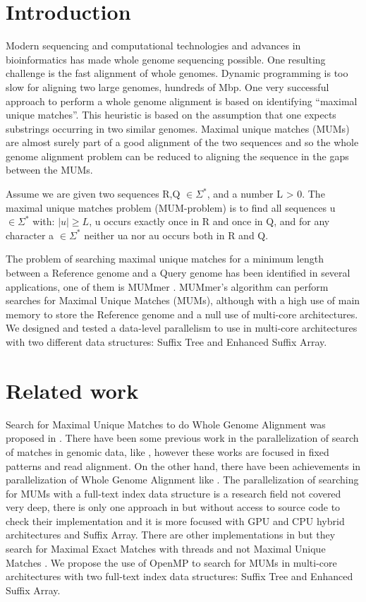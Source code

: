 \documentclass[runningheads,a4paper]{llncs}
\begin{document}
\section{Introduction} 
Modern sequencing and computational technologies and advances in bioinformatics has made whole genome sequencing possible. One resulting challenge is the fast alignment of whole genomes. Dynamic programming is too slow for aligning two large genomes, hundreds of Mbp. One very successful approach to perform a whole genome alignment is based on identifying ``maximal unique matches''. This heuristic is based on the assumption that one expects substrings occurring in two similar genomes. Maximal unique matches (MUMs) are almost surely part of a good alignment of the two sequences and so the whole genome alignment problem can be reduced to aligning the sequence in the gaps between the MUMs.
\begin{definition}
Assume we are given two sequences R,Q $\in \Sigma^*$, and a number L > 0. The maximal unique matches problem (MUM-problem) is to find all sequences u $\in \Sigma^*$ with: $|u|\geq L$, u occurs exactly once in R and once in Q, and for any character a $\in \Sigma^*$ neither ua nor au occurs both in R and Q.
\end{definition}
The problem of searching maximal unique matches for a minimum length between a Reference genome and a Query genome has been identified in several applications, one of them is MUMmer \cite{Delcher2003}. MUMmer's algorithm can perform searches for Maximal Unique Matches (MUMs), although with a high use of main memory to store the Reference genome and a null use of multi-core architectures.
We designed and tested a data-level parallelism to use in multi-core architectures with two different data structures: Suffix Tree and Enhanced Suffix Array.
\section{Related work}
Search for Maximal Unique Matches to do Whole Genome Alignment was proposed in \cite{Delcher1999}. There have been some previous work in the parallelization of search of matches in genomic data, like \cite{OguzhanKulekci2011,Mongelli,Kouzinopoulos2005}, however these works are focused in fixed patterns and read alignment. On the other hand, there have been achievements in parallelization of Whole Genome Alignment like \cite{Meng2005}. The parallelization of searching for MUMs with a full-text index data structure is a research field not covered very deep, there is only one approach in \cite{Encarnac2011} but without access to source code to check their implementation and it is more focused with GPU and CPU hybrid architectures and Suffix Array. There are other implementations in \cite{Vyverman2013,OguzhanKulekci2011,Khan2009,OhlebuschGK10} but they search for Maximal Exact Matches with threads and not Maximal Unique Matches . We propose the use of OpenMP to search for MUMs in multi-core architectures with two full-text index data structures: Suffix Tree and Enhanced Suffix Array.
\end{document}
